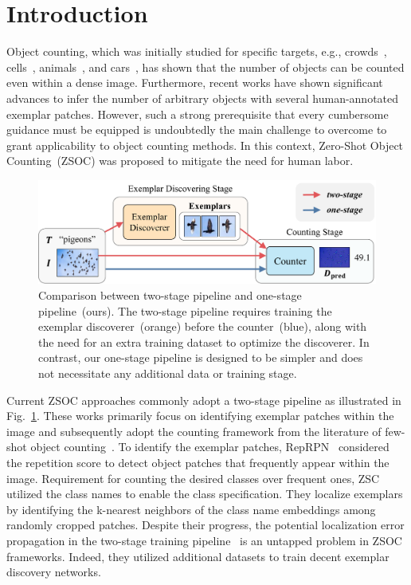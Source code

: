 \section{Introduction}


Object counting, which was initially studied for specific targets, e.g., crowds~\cite{h8}, cells~\cite{2018cell}, animals~\cite{2016animal}, and cars~\cite{2016cars}, has shown that the number of objects can be counted even within a dense image.
Furthermore, recent works have shown significant advances to infer the number of arbitrary objects with several human-annotated exemplar patches.
However, such a strong prerequisite that every cumbersome guidance must be equipped is undoubtedly the main challenge to overcome to grant applicability to object counting methods.
In this context, Zero-Shot Object Counting~(ZSOC) was proposed to mitigate the need for human labor.


\begin{figure}[t]
    \begin{center}
    \includegraphics[width=\linewidth]{figs/intro_v3.pdf}
    \end{center}
    \caption{
        Comparison between two-stage pipeline and one-stage pipeline~(ours).
        The two-stage pipeline requires training the exemplar discoverer~(orange) before the counter~(blue), along with the need for an extra training dataset to optimize the discoverer.
        In contrast, our one-stage pipeline is designed to be simpler and does not necessitate any additional data or training stage. 
    }
    \label{fig:intro}
\end{figure}


Current ZSOC approaches commonly adopt a two-stage pipeline as illustrated in Fig.~\ref{fig:intro}.
These works primarily focus on identifying exemplar patches within the image and subsequently adopt the counting framework from the literature of few-shot object counting~\cite{2022BMNet, 2021FAMNet}.
To identify the exemplar patches, RepRPN~\cite{2022RepRPN} considered the repetition score to detect object patches that frequently appear within the image.
Requirement for counting the desired classes over frequent ones, ZSC~\cite{2023zsc} utilized the class names to enable the class specification.
They localize exemplars by identifying the k-nearest neighbors of the class name embeddings among randomly cropped patches.
Despite their progress, the potential localization error propagation in the two-stage training pipeline~\cite{nag2022zero} is an untapped problem in ZSOC frameworks.
Indeed, they utilized additional datasets to train decent exemplar discovery networks.




